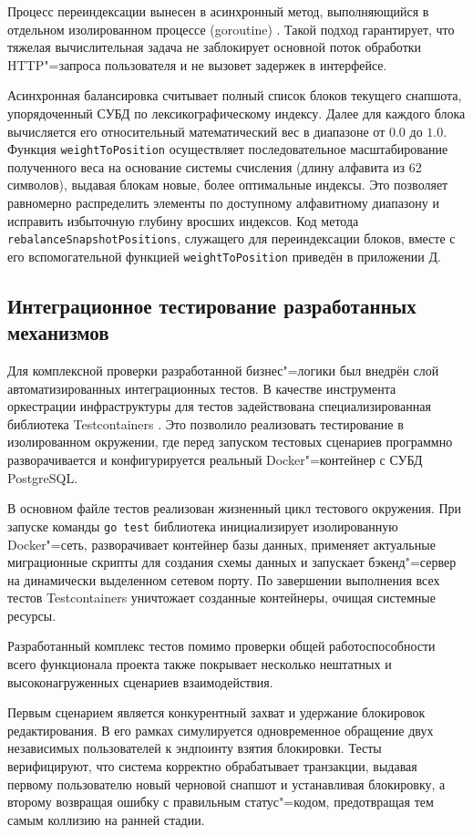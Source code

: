 \documentclass[coursework]{SCWorks}
\begin{document}
Процесс переиндексации вынесен в асинхронный метод, выполняющийся в отдельном изолированном процессе (goroutine) \cite{donovan_go}. Такой подход гарантирует, что тяжелая вычислительная задача не заблокирует основной поток обработки HTTP"=запроса пользователя и не вызовет задержек в интерфейсе.

Асинхронная балансировка считывает полный список блоков текущего снапшота, упорядоченный СУБД по лексикографическому индексу. Далее для каждого блока вычисляется его относительный математический вес в диапазоне от $0.0$ до $1.0$. Функция \texttt{weightToPosition} осуществляет последовательное масштабирование полученного веса на основание системы счисления (длину алфавита из 62 символов), выдавая блокам новые, более оптимальные индексы. Это позволяет равномерно распределить элементы по доступному алфавитному диапазону и исправить избыточную глубину вросших индексов. Код метода \texttt{rebalanceSnapshotPositions}, служащего для переиндексации блоков, вместе с его вспомогательной функцией \texttt{weightToPosition} приведён в приложении Д.

\subsection{Интеграционное тестирование разработанных механизмов}

Для комплексной проверки разработанной бизнес"=логики был внедрён слой автоматизированных интеграционных тестов. В качестве инструмента оркестрации инфраструктуры для тестов задействована специализированная библиотека Testcontainers \cite{testcontainers}. Это позволило реализовать тестирование в изолированном окружении, где перед запуском тестовых сценариев программно разворачивается и конфигурируется реальный Docker"=контейнер с СУБД PostgreSQL.

В основном файле тестов реализован жизненный цикл тестового окружения. При запуске команды \texttt{go test} библиотека инициализирует изолированную Docker"=сеть, разворачивает контейнер базы данных, применяет актуальные миграционные скрипты для создания схемы данных и запускает бэкенд"=сервер на динамически выделенном сетевом порту. По завершении выполнения всех тестов Testcontainers уничтожает созданные контейнеры, очищая системные ресурсы.

Разработанный комплекс тестов помимо проверки общей работоспособности всего функционала проекта также покрывает несколько нештатных и высоконагруженных сценариев взаимодействия.

Первым сценарием является конкурентный захват и удержание блокировок редактирования. В его рамках симулируется одновременное обращение двух независимых пользователей к эндпоинту взятия блокировки. Тесты верифицируют, что система корректно обрабатывает транзакции, выдавая первому пользователю новый черновой снапшот и устанавливая блокировку, а второму возвращая ошибку с правильным статус"=кодом, предотвращая тем самым коллизию на ранней стадии.
\end{document}

